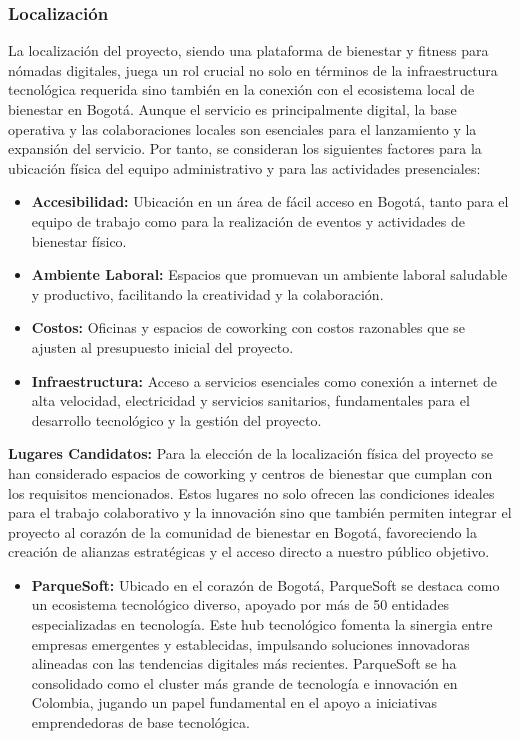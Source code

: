 {\subsubsection*{Localización}

La localización del proyecto, siendo una plataforma de bienestar y fitness para nómadas digitales, juega un rol crucial no solo en términos de la infraestructura tecnológica requerida sino también en la conexión con el ecosistema local de bienestar en Bogotá. Aunque el servicio es principalmente digital, la base operativa y las colaboraciones locales son esenciales para el lanzamiento y la expansión del servicio. Por tanto, se consideran los siguientes factores para la ubicación física del equipo administrativo y para las actividades presenciales:

\begin{itemize}
    \item \textbf{Accesibilidad:} Ubicación en un área de fácil acceso en Bogotá, tanto para el equipo de trabajo como para la realización de eventos y actividades de bienestar físico.
    \item \textbf{Ambiente Laboral:} Espacios que promuevan un ambiente laboral saludable y productivo, facilitando la creatividad y la colaboración.
    \item \textbf{Costos:} Oficinas y espacios de coworking con costos razonables que se ajusten al presupuesto inicial del proyecto.
    \item \textbf{Infraestructura:} Acceso a servicios esenciales como conexión a internet de alta velocidad, electricidad y servicios sanitarios, fundamentales para el desarrollo tecnológico y la gestión del proyecto.
\end{itemize}

\textbf{Lugares Candidatos:} Para la elección de la localización física del proyecto se han considerado espacios de coworking y centros de bienestar que cumplan con los requisitos mencionados. Estos lugares no solo ofrecen las condiciones ideales para el trabajo colaborativo y la innovación sino que también permiten integrar el proyecto al corazón de la comunidad de bienestar en Bogotá, favoreciendo la creación de alianzas estratégicas y el acceso directo a nuestro público objetivo.

\begin{itemize}
     \item \textbf{ParqueSoft:} Ubicado en el corazón de Bogotá, ParqueSoft se destaca como un ecosistema tecnológico diverso, apoyado por más de 50 entidades especializadas en tecnología. Este hub tecnológico fomenta la sinergia entre empresas emergentes y establecidas, impulsando soluciones innovadoras alineadas con las tendencias digitales más recientes. ParqueSoft se ha consolidado como el cluster más grande de tecnología e innovación en Colombia, jugando un papel fundamental en el apoyo a iniciativas emprendedoras de base tecnológica.


\end{itemize}}

